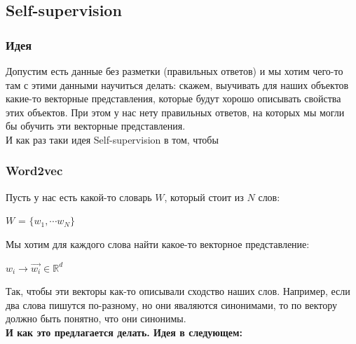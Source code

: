         \subsection{Self-supervision}
            \subsubsection{Идея}

                Допустим есть данные без разметки (правильных ответов) и мы хотим чего-то там с этими данными научиться делать: скажем, выучивать для наших объектов какие-то векторные представления, которые будут хорошо описывать свойства этих объектов. При этом у нас нету правильных ответов, на которых мы могли бы обучить эти векторные представления.\\

                И как раз таки идея Self-supervision в том, чтобы 
            \subsubsection{Word2vec}

                Пусть у нас есть какой-то словарь $W$, который стоит из $N$ слов:
                \begin{center}
                    $W$ = $\{w_1, \cdots w_N \}$
                \end{center}
                Мы хотим для каждого слова найти какое-то векторное представление:
                \begin{center}
                    $w_i \to \vec{w_i} \in \mathbb{R}^d$
                \end{center}
                Так, чтобы эти векторы как-то описывали сходство наших слов. Например, если два слова пишутся по-разному, но они яваляются синонимами, то по вектору должно быть понятно, что они синонимы. \\

                \textbf{И как это предлагается делать. Идея в следующем:}\\

